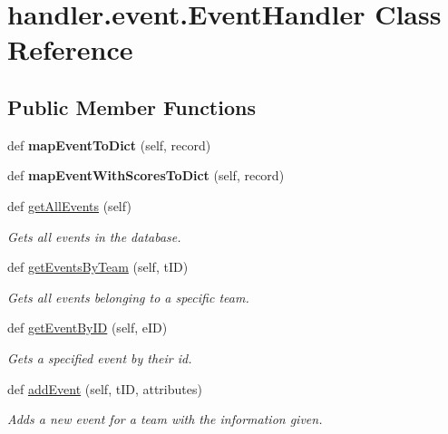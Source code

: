 \hypertarget{classhandler_1_1event_1_1_event_handler}{}\section{handler.\+event.\+Event\+Handler Class Reference}
\label{classhandler_1_1event_1_1_event_handler}
\subsection*{Public Member Functions}
\begin{DoxyCompactItemize}
\item 
\mbox{\label{classhandler_1_1event_1_1_event_handler_a5e837eb3451d29138a27d95b1ed7575d}} 
def {\bfseries map\+Event\+To\+Dict} (self, record)
\item 
\mbox{\label{classhandler_1_1event_1_1_event_handler_a75d66da35627aebf7cc6cff5cb93f6e0}} 
def {\bfseries map\+Event\+With\+Scores\+To\+Dict} (self, record)
\item 
def \hyperlink{classhandler_1_1event_1_1_event_handler_a5ea11d438c3a6c39524dcde68f87a6c2}{get\+All\+Events} (self)
\begin{DoxyCompactList}\small\item\em Gets all events in the database. \end{DoxyCompactList}\item 
def \hyperlink{classhandler_1_1event_1_1_event_handler_a0b5135c2269c49c58f165e428d7976fd}{get\+Events\+By\+Team} (self, t\+ID)
\begin{DoxyCompactList}\small\item\em Gets all events belonging to a specific team. \end{DoxyCompactList}\item 
def \hyperlink{classhandler_1_1event_1_1_event_handler_ab5e4836ec9f0aea002d0be3f7227566e}{get\+Event\+By\+ID} (self, e\+ID)
\begin{DoxyCompactList}\small\item\em Gets a specified event by their id. \end{DoxyCompactList}\item 
def \hyperlink{classhandler_1_1event_1_1_event_handler_a6c97fb08cd641f3d2dd07a6b5afc0a37}{add\+Event} (self, t\+ID, attributes)
\begin{DoxyCompactList}\small\item\em Adds a new event for a team with the information given. \end{DoxyCompactList}\item 

\end{DoxyCompactItemize}
